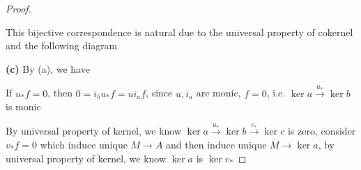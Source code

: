 \documentclass{article}
\theoremstyle{definition}
\theoremstyle{remark}
\theoremstyle{definition}
\begin{document}
\begin{proof}
\begin{center}
\begin{tikzcd}
\end{tikzcd}
\end{center}
This bijective correspondence is natural due to the universal property of cokernel and the following diagram
\begin{center}
\end{center}
\textbf{(c) }By (a), we have
\begin{center}
\end{center}
If $u_*f=0$, then $0=i_bu_*f=ui_af$, since $u,i_a$ are monic, $f=0$, i.e. $\ker a\xrightarrow{u_*}\ker b$ is monic \par
By universal property of kernel, we know $\ker a\xrightarrow{u_*}\ker b\xrightarrow{v_*}\ker c$ is zero, consider $v_*f=0$ which induce unique $M\to A$ and then induce unique $M\to\ker a$, by universal property of kernel, we know $\ker a$ is $\ker v_*$

\end{proof}
\end{document}
